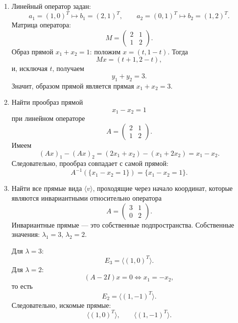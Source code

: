 \begin{enumerate}
\begin{enumerate}[label=\arabic*)]
\item Прямая
\[
2x_1-x_2=-2
\]
параметризуется как \(x=(t,2t+2)\). Тогда
\[
Mx=(t+6,4-t),
\]
и образом будет прямая
\[
x_1+x_2=10.
\]

\item Прообраз этой прямой --- множество решений системы
\[
2(Mx)_1-(Mx)_2=-2.
\]
То есть
\[
2(-5x_1+3x_2)-(-5x_1+2x_2)=-2
\iff -5x_1+4x_2=-2,
\]
или
\[
5x_1-4x_2=2.
\]

\item Прямые, переходящие сами в себя, --- это одномерные инвариантные подпространства, то есть собственные подпространства. У матрицы \(M\) собственные значения комплексные:
\[
\lambda=-\frac32\pm \frac{i\sqrt{11}}2,
\]
поэтому над \(\mathbb R\) инвариантных прямых нет.
\end{enumerate}

\item
Линейный оператор задан:
\[
a_1=(1,0)^T \mapsto b_1=(2,1)^T,\qquad
a_2=(0,1)^T \mapsto b_2=(1,2)^T.
\]
Матрица оператора:
\[
M=\begin{pmatrix}2&1\\1&2\end{pmatrix}.
\]
Образ прямой \(x_1+x_2=1\): положим \(x=(t,1-t)\). Тогда
\[
Mx=(t+1,2-t),
\]
и, исключая \(t\), получаем
\[
y_1+y_2=3.
\]
Значит, образом прямой является прямая \(x_1+x_2=3\).

\item
Найти прообраз прямой
\[
x_1-x_2=1
\]
при линейном операторе
\[
A=\begin{pmatrix}
2&1\\
1&2
\end{pmatrix}.
\]
Имеем
\[
(Ax)_1-(Ax)_2=(2x_1+x_2)-(x_1+2x_2)=x_1-x_2.
\]
Следовательно, прообраз совпадает с самой прямой:
\[
A^{-1}(\{x_1-x_2=1\})=\{x_1-x_2=1\}.
\]

\item
Найти все прямые вида \(\langle v\rangle\), проходящие через начало координат, которые являются инвариантными относительно оператора
\[
A=\begin{pmatrix}
3&1\\
0&2
\end{pmatrix}.
\]
Инвариантные прямые --- это собственные подпространства. Собственные значения: \(\lambda_1=3\), \(\lambda_2=2\).

Для \(\lambda=3\):
\[
E_3=\langle (1,0)^T\rangle.
\]
Для \(\lambda=2\):
\[
(A-2I)x=0 \iff x_1=-x_2,
\]
то есть
\[
E_2=\langle (1,-1)^T\rangle.
\]
Следовательно, искомые прямые:
\[
\langle (1,0)^T\rangle,\qquad \langle (1,-1)^T\rangle.
\]


\end{enumerate}
